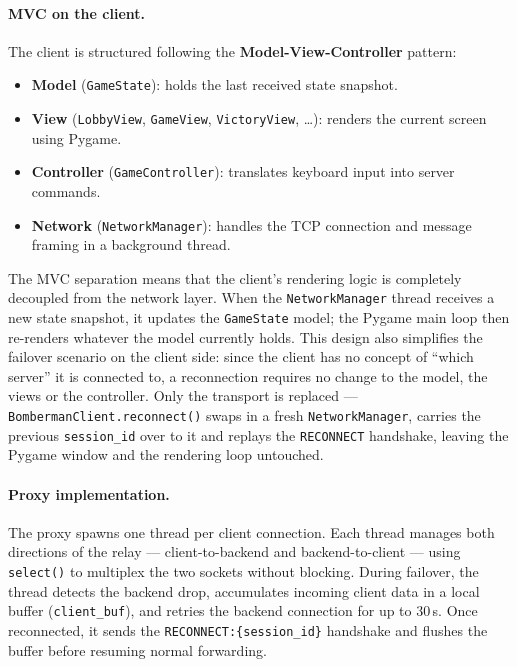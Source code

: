 \documentclass{scrartcl}
\begin{document}
\paragraph{MVC on the client.}
The client is structured following the \textbf{Model-View-Controller} pattern:
\begin{itemize}
    \item \textbf{Model} (\texttt{GameState}): holds the last received state snapshot.
    \item \textbf{View} (\texttt{LobbyView}, \texttt{GameView}, \texttt{VictoryView}, \ldots): renders the current screen using Pygame.
    \item \textbf{Controller} (\texttt{GameController}): translates keyboard input into server commands.
    \item \textbf{Network} (\texttt{NetworkManager}): handles the TCP connection and message framing in a background thread.
\end{itemize}

The MVC separation means that the client's rendering logic is completely decoupled from the network layer.
When the \texttt{NetworkManager} thread receives a new state snapshot, it updates the \texttt{GameState} model; the Pygame main loop then re-renders whatever the model currently holds.
This design also simplifies the failover scenario on the client side: since the client has no concept of ``which server'' it is connected to, a reconnection requires no change to the model, the views or the controller.
Only the transport is replaced --- \texttt{BombermanClient.reconnect()} swaps in a fresh \texttt{NetworkManager}, carries the previous \texttt{session\_id} over to it and replays the \texttt{RECONNECT} handshake, leaving the Pygame window and the rendering loop untouched.

\paragraph{Proxy implementation.}
The proxy spawns one thread per client connection.
Each thread manages both directions of the relay — client-to-backend and backend-to-client — using \texttt{select()} to multiplex the two sockets without blocking.
During failover, the thread detects the backend drop, accumulates incoming client data in a local buffer (\texttt{client\_buf}), and retries the backend connection for up to 30\,s.
Once reconnected, it sends the \texttt{RECONNECT:\{session\_id\}} handshake and flushes the buffer before resuming normal forwarding.
\end{document}
